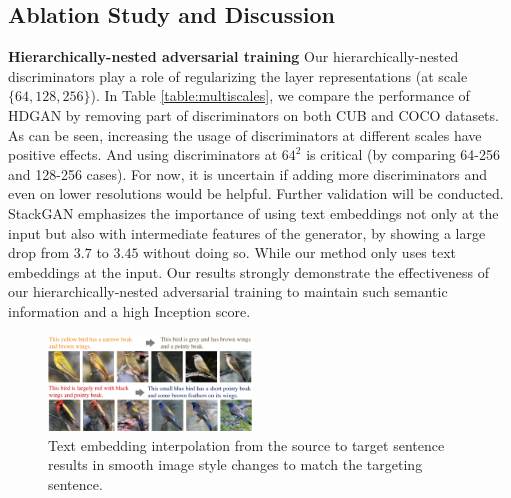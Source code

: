 \documentclass[10pt,twocolumn,letterpaper]{article}
\begin{document}
\subsection{Ablation Study and Discussion}
\textbf{Hierarchically-nested adversarial training} Our hierarchically-nested discriminators play a role of regularizing the layer representations (at scale $\{64, 128, 256\}$). 
In Table \ref{table:multiscales}, we compare the performance of HDGAN by removing part of discriminators on both CUB and COCO datasets. 
As can be seen, increasing the usage of discriminators at different scales have positive effects. And using discriminators at $64^2$ is critical (by comparing 64-256 and 128-256 cases). For now, it is uncertain if adding more discriminators and even on lower resolutions would be helpful. Further validation will be conducted.
StackGAN emphasizes the importance of using text embeddings not only at the input but also with intermediate features of the generator, by showing a large drop from $3.7$ to $3.45$ without doing so. While our method only uses text embeddings at the input. Our results strongly demonstrate the effectiveness of our hierarchically-nested adversarial training to maintain such semantic information and a high Inception score. 

\begin{figure}[t]
    \centering
    \includegraphics[width=0.48\textwidth]{figure/interp.pdf}
    \vspace{-.6cm}
    \caption{Text embedding interpolation from the source to target sentence results in smooth image style changes to match the targeting sentence. } \label{fig:interp}
    \vspace{-.3cm}
\end{figure}
\end{document}
